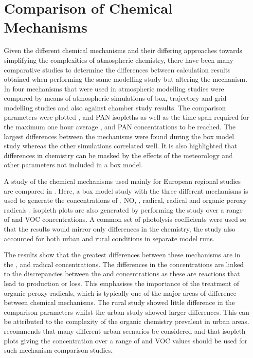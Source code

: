 \section{Comparison of Chemical Mechanisms}
Given the different chemical mechanisms and their differing approaches towards simplifying the complexities of atmospheric 
chemistry, there have been many comparative studies to determine the differences between calculation results obtained when 
performing the same modelling study but altering the mechanism. In \citep{Dunker:1984} four mechanisms that were used in 
atmospheric modelling studies were compared by means of atmospheric simulations of box, trajectory and grid modelling studies 
and also against chamber study results. The comparison parameters were plotted ,  and PAN isopleths as well as 
the time span required for the maximum one hour average ,  and PAN concentrations to be reached. The largest 
differences between the mechanisms were found during the box model study whereas the other simulations correlated well. It is 
also highlighted that differences in chemistry can be masked by the effects of the meteorology and other parameters not included
in a box model.

A study of the chemical mechanisms used mainly for European regional studies are compared in \citep{Gross:2003}. Here, a box 
model study with the three different mechanisms is used to generate the concentrations of , NO, ,  
radical,  radical and organic peroxy radicals .  isopleth plots are also generated by performing the 
study over a range of  and VOC concentrations. A common set of photolysis coefficients were used so that the results 
would mirror only differences in the chemistry, the study also accounted for both urban and rural conditions in separate model 
runs.

The results show that the greatest differences between these mechanisms are in the ,  and  radical 
concentrations. The differences in the  concentrations are linked to the discrepancies between the  and  
concentrations as these are reactions that lead to  production or loss. This emphasises the importance of the treatment
of organic peroxy radicals, which is typically one of the major areas of difference between chemical mechanisms. The rural study
showed little difference in the comparison parameters whilst the urban study showed larger differences. This can be attributed 
to the complexity of the organic chemistry prevalent in urban areas. \citep{Gross:2003} recommends that many different urban 
scenarios be considered and that  isopleth plots giving the  concentration over a range of  and VOC 
values should be used for such mechanism comparison studies. 

